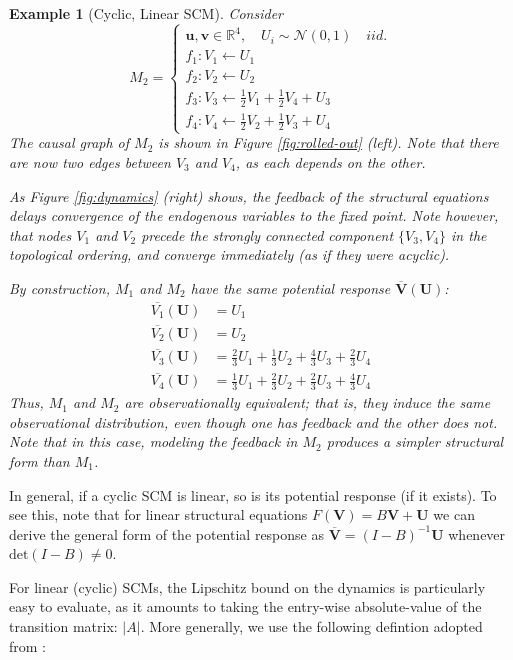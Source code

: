 \documentclass[letterpaper,10pt]{article}
\newtheorem{example}{Example}
\begin{document}
\begin{example}[Cyclic, Linear SCM]\label{ex:cyclic-linear}
Consider
\[
M_2 = 
\begin{cases}
\mathbf{u}, \mathbf{v}\in \mathbb{R}^4, \quad U_i \sim \mathcal{N}(0,1) \quad iid. \\
f_1:V_1\leftarrow U_1 \\
f_2:V_2\leftarrow U_2 \\
f_3:V_3\leftarrow \frac{1}{2}V_1+\frac{1}{2}V_4+U_3 \\
f_4:V_4\leftarrow \frac{1}{2}V_2+\frac{1}{2}V_3+U_4
\end{cases}
\]
The causal graph of $M_2$ is shown in Figure \ref{fig:rolled-out} (left).
Note that there are now two edges between $V_3$ and $V_4$, as each depends on the other.

As Figure \ref{fig:dynamics} (right) shows, the feedback of the structural equations delays convergence of the endogenous variables to the fixed point. Note however, that nodes $V_1$ and $V_2$ precede the strongly connected component $\{V_3,V_4\}$ in the topological ordering, and converge immediately (as if they were acyclic).

By construction, $M_1$ and $M_2$ have the same potential response $\overline{\mathbf{V}}(\mathbf{U})$:
\begin{align*}
\overline{V_1}(\mathbf{U}) &= U_1 \\
\overline{V_2}(\mathbf{U}) &= U_2 \\
\overline{V_3}(\mathbf{U}) &= \frac{2}{3}U_1+\frac{1}{3}U_2+\frac{4}{3}U_3+\frac{2}{3}U_4 \\
\overline{V_4}(\mathbf{U}) &= \frac{1}{3}U_1+\frac{2}{3}U_2+\frac{2}{3}U_3+\frac{4}{3}U_4
\end{align*}
Thus, $M_1$ and $M_2$ are observationally equivalent; that is, they induce the same observational distribution, even though one has feedback and the other does not. Note that in this case, modeling the feedback in $M_2$ produces a simpler structural form than $M_1$.
\end{example}

In general, if a cyclic SCM is linear, so is its potential response (if it exists). To see this, note that for linear structural equations $F(\mathbf{V}) = B\mathbf{V}+\mathbf{U}$ we can derive the general form of the potential response as $\overline{\mathbf{V}}=(I-B)^{-1}\mathbf{U}$ whenever $\text{det}(I-B)\neq 0$.

For linear (cyclic) SCMs, the Lipschitz bound on the dynamics is particularly easy to evaluate, as it amounts to taking the entry-wise absolute-value of the transition matrix: $\lvert A\rvert$. More generally, we use the following defintion adopted from \cite{ReberIntrinsic}:
\end{document}
